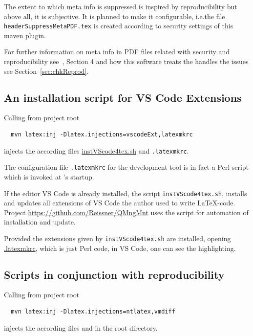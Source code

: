The extent to which meta info is suppressed is inspired by reproducibility 
but above all, it is subjective. 
It is planned to make it configurable, 
i.e.\@ the file \texttt{headerSuppressMetaPDF.tex} 
is created according to security settings of this maven plugin. 

For further information on meta info in PDF files 
related with security and reproducibility 
see~\cite{LatexGen}, Section 4 
and how this software treats the handles the issues 
see Section~\ref{sec:chkReprod}. 


\subsection{An installation script for VS Code Extensions}\label{subsec:instExtVsCode}

Calling from project root 
%
\begin{Verbatim}
  mvn latex:inj -Dlatex.injections=vscodeExt,latexmkrc
\end{Verbatim}
%
injects the according files \href{\urlSite fromMain/instVScode4tex}{instVScode4tex.sh} and \texttt{.latexmkrc}. 

The configuration file \texttt{.latexmkrc} 
for the development tool  is in fact a Perl script 
which is invoked at 's startup. 

If the editor VS Code is already installed, 
the script \texttt{instVScode4tex.sh}, 
installs and updates all extensions of VS Code the author used to write \LaTeX-code. 
Project \url{https://github.com/Reissner/QMngMnt} 
uses the script for automation of installation and update. 

Provided the extensions given by \texttt{instVScode4tex.sh} are installed, 
opening \href{\urlSite fromTex/.latexmkrc}{.latexmkrc}, 
which is just Perl code, in VS Code, one can see the highlighting.



\subsection{Scripts in conjunction with reproducibility}%
\label{subsec:ntlatexVmdiff}

Calling from project root 
%
\begin{Verbatim}
  mvn latex:inj -Dlatex.injections=ntlatex,vmdiff
\end{Verbatim}
%
injects the according files  and  
in the root directory. 

